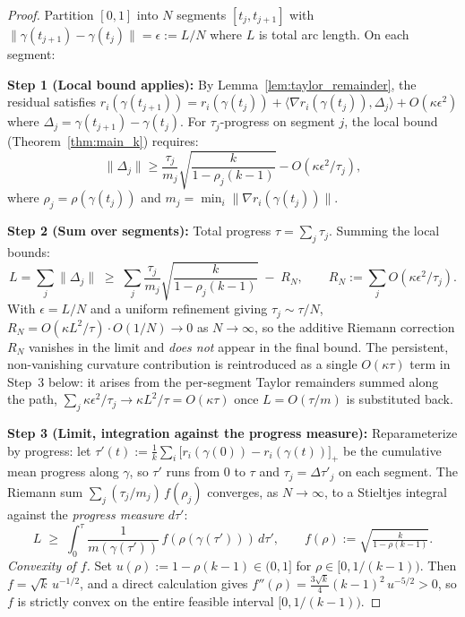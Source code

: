 \documentclass{article}
\theoremstyle{plain}
\theoremstyle{definition}
\theoremstyle{remark}
\begin{document}
\begin{proof}
Partition $[0,1]$ into $N$ segments $[t_j, t_{j+1}]$ with $\|\gamma(t_{j+1}) - \gamma(t_j)\| = \epsilon := L/N$ where $L$ is total arc length. On each segment:

\textbf{Step 1 (Local bound applies):} By Lemma~\ref{lem:taylor_remainder}, the residual satisfies $r_i(\gamma(t_{j+1})) = r_i(\gamma(t_j)) + \langle \nabla r_i(\gamma(t_j)), \Delta_j \rangle + O(\kappa\epsilon^2)$ where $\Delta_j = \gamma(t_{j+1}) - \gamma(t_j)$. For $\tau_j$-progress on segment $j$, the local bound (Theorem~\ref{thm:main_k}) requires:
\[
\|\Delta_j\| \ge \frac{\tau_j}{m_j}\sqrt{\frac{k}{1-\rho_j(k-1)}} - O(\kappa\epsilon^2/\tau_j),
\]
where $\rho_j = \rho(\gamma(t_j))$ and $m_j = \min_i\|\nabla r_i(\gamma(t_j))\|$.

\textbf{Step 2 (Sum over segments):} Total progress $\tau = \sum_j \tau_j$. Summing the local bounds:
\[
L = \sum_j \|\Delta_j\| \;\ge\; \sum_j \frac{\tau_j}{m_j}\sqrt{\frac{k}{1-\rho_j(k-1)}} \;-\; R_N,
\qquad R_N := \sum_j O(\kappa\epsilon^2/\tau_j).
\]
With $\epsilon = L/N$ and a uniform refinement giving $\tau_j \sim \tau/N$, $R_N = O(\kappa L^2/\tau)\cdot O(1/N) \to 0$ as $N\to\infty$, so the additive Riemann correction $R_N$ vanishes in the limit and \emph{does not} appear in the final bound. The persistent, non-vanishing curvature contribution is reintroduced as a single $O(\kappa\tau)$ term in Step~3 below: it arises from the per-segment Taylor remainders summed along the path, $\sum_j \kappa\epsilon^2/\tau_j \to \kappa L^2/\tau = O(\kappa\tau)$ once $L = O(\tau/m)$ is substituted back.

\textbf{Step 3 (Limit, integration against the progress measure):} Reparameterize by progress: let $\tau'(t) := \tfrac{1}{k}\sum_i \big[r_i(\gamma(0)) - r_i(\gamma(t))\big]_+$ be the cumulative mean progress along $\gamma$, so $\tau'$ runs from $0$ to $\tau$ and $\tau_j = \Delta\tau'_j$ on each segment. The Riemann sum $\sum_j (\tau_j/m_j)\,f(\rho_j)$ converges, as $N\to\infty$, to a Stieltjes integral against the \emph{progress measure} $d\tau'$:
\[
L \;\ge\; \int_0^\tau \frac{1}{m(\gamma(\tau'))}\,f(\rho(\gamma(\tau')))\, d\tau',
\qquad f(\rho) := \sqrt{\tfrac{k}{1-\rho(k-1)}}.
\]
\emph{Convexity of $f$.} Set $u(\rho) := 1-\rho(k-1) \in (0,1]$ for $\rho \in [0, 1/(k-1))$. Then $f = \sqrt{k}\, u^{-1/2}$, and a direct calculation gives $f''(\rho) = \tfrac{3\sqrt{k}}{4}(k-1)^2\, u^{-5/2} > 0$, so $f$ is strictly convex on the entire feasible interval $[0, 1/(k-1))$.


\end{proof}
\end{document}
